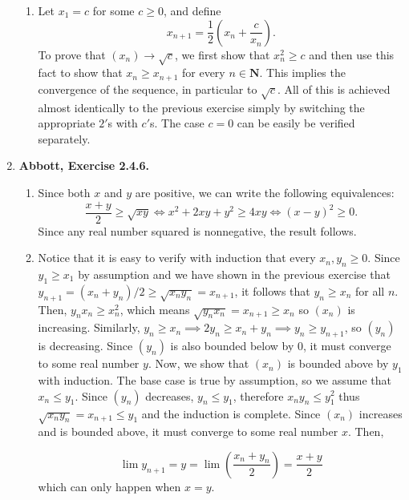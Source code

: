 \documentclass{article}
\newcommand{\N}{\mathbf{N}}
\newcommand{\exc}[2][Abbott]{\item \textbf{#1, Exercise #2.}}
\begin{document}
\begin{enumerate}
\begin{enumerate}
        \item Let $x_1 = c$ for some $c \geq 0$, and define
        \begin{equation*}
            x_{n+1} = \frac{1}{2} \left(x_n + \frac{c}{x_n} \right).
        \end{equation*} To prove that $(x_n) \to \sqrt{c}$, we first show that $x_n^2 \geq c$ and then use this fact to show that $x_n \geq x_{n+1}$ for every $n \in \N$. This implies the convergence of the sequence, in particular to $\sqrt{c}$. All of this is achieved almost identically to the previous exercise simply by switching the appropriate $2'$s with $c'$s. The case $c = 0$ can be easily be verified separately.
    \end{enumerate}
    
    \exc{2.4.6}
    
    \begin{enumerate}
        \item Since both $x$ and $y$ are positive, we can write the following equivalences:
        \begin{equation*}
            \frac{x+y}{2} \geq \sqrt{x y} \iff x^2+2x y+y^2 \geq 4x y \iff  \left(x-y\right)^2 \geq 0.
        \end{equation*} Since any real number squared is nonnegative, the result follows.
        
        \item Notice that it is easy to verify with induction that every $x_n, y_n \geq 0$.
        Since $y_1 \geq x_1$ by assumption and we have shown in the previous exercise that $y_{n+1} = (x_n+y_n)/2 \geq \sqrt{x_n y_n}= x_{n+1}$, it follows that $y_n \geq x_n$ for all $n$. Then, $y_n x_n \geq x_n^2$, which means $\sqrt{y_n x_n} = x_{n+1} \geq x_n$ so $(x_n)$ is increasing. Similarly, $y_n \geq x_n \implies 2y_n \geq x_n + y_n \implies y_n \geq y_{n+1}$, so $(y_n)$ is decreasing. Since $(y_n)$ is also bounded below by $0$, it must converge to some real number $y$. Now, we show that $(x_n)$ is bounded above by $y_1$ with induction. The base case is true by assumption, so we assume that $x_n \leq y_1$. Since $(y_n)$ decreases, $y_n \leq y_1$, therefore $x_n y_n \leq y_1^2$ thus $\sqrt{x_n y_n} = x_{n+1} \leq y_1$ and the induction is complete. Since $(x_n)$ increases and is bounded above, it must converge to some real number $x$. Then, 
        
        \begin{equation*}
            \lim y_{n+1} = y = \lim (\frac{x_n + y_n}{2}) = \frac{x + y}{2}
        \end{equation*} which can only happen when $x = y$.
    \end{enumerate}


\end{enumerate}
\end{document}
